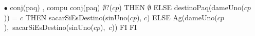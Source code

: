 \begin{itemize}
\item[$\bullet$] {conj(paq) , compu} {conj(paq)} {}
 {\IF $\emptyset?$($cp$)
											 THEN $\emptyset$
											 ELSE {\IF destinoPaq(dameUno($cp$)) = $c$
											 		THEN sacarSiEsDestino(sinUno($cp$), $c$)
											 		ELSE \mbox{Ag(dameUno($cp$), sacarSiEsDestino(sinUno($cp$), $c$))}
											 		FI}
											 FI}
\end{itemize}